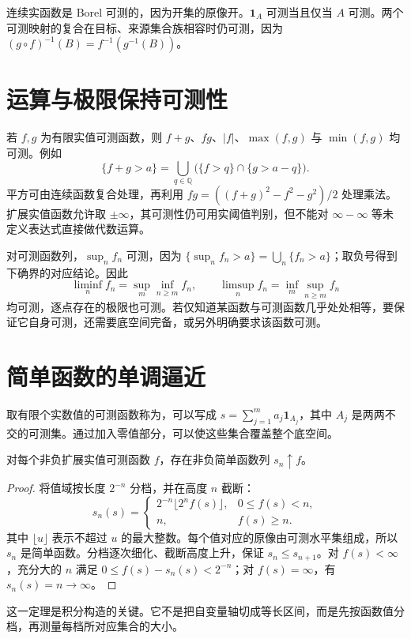 \documentclass[UTF8,12pt,a4paper,fontset=fandol]{ctexbook}
\begin{document}
连续实函数是 Borel 可测的，因为开集的原像开。$\mathbf1_A$ 可测当且仅当 $A$ 可测。两个可测映射的复合在目标、来源集合族相容时仍可测，因为 $(g\circ f)^{-1}(B)=f^{-1}(g^{-1}(B))$。

\section{运算与极限保持可测性}
若 $f,g$ 为有限实值可测函数，则 $f+g$、$fg$、$|f|$、$\max(f,g)$ 与 $\min(f,g)$ 均可测。例如
\[
 \{f+g>a\}=\bigcup_{q\in\mathbb Q}\bigl(\{f>q\}\cap\{g>a-q\}\bigr).
\]
平方可由连续函数复合处理，再利用 $fg=((f+g)^2-f^2-g^2)/2$ 处理乘法。扩展实值函数允许取 $\pm\infty$，其可测性仍可用实阈值判别，但不能对 $\infty-\infty$ 等未定义表达式直接做代数运算。

对可测函数列，$\sup_nf_n$ 可测，因为 $\{\sup_nf_n>a\}=\bigcup_n\{f_n>a\}$；取负号得到下确界的对应结论。因此
\[
 \liminf_nf_n=\sup_m\inf_{n\geq m}f_n,\qquad
 \limsup_nf_n=\inf_m\sup_{n\geq m}f_n
\]
均可测，逐点存在的极限也可测。若仅知道某函数与可测函数几乎处处相等，要保证它自身可测，还需要底空间完备，或另外明确要求该函数可测。

\section{简单函数的单调逼近}
\begin{definition}
取有限个实数值的可测函数称为，可以写成 $s=\sum_{j=1}^{m}a_j\mathbf1_{A_j}$，其中 $A_j$ 是两两不交的可测集。通过加入零值部分，可以使这些集合覆盖整个底空间。
\end{definition}

\begin{theorem}
对每个非负扩展实值可测函数 $f$，存在非负简单函数列 $s_n\uparrow f$。
\label{thm:mt-simple-approximation}
\end{theorem}
\begin{proof}
将值域按长度 $2^{-n}$ 分档，并在高度 $n$ 截断：
\[
 s_n(s)=
 \begin{cases}
  2^{-n}\lfloor 2^nf(s)\rfloor,&0\leq f(s)<n,\\
  n,&f(s)\geq n.
 \end{cases}
\]
其中 $\lfloor u\rfloor$ 表示不超过 $u$ 的最大整数。每个值对应的原像由可测水平集组成，所以 $s_n$ 是简单函数。分档逐次细化、截断高度上升，保证 $s_n\leq s_{n+1}$。对 $f(s)<\infty$，充分大的 $n$ 满足 $0\leq f(s)-s_n(s)<2^{-n}$；对 $f(s)=\infty$，有 $s_n(s)=n\to\infty$。
\end{proof}
这一定理是积分构造的关键。它不是把自变量轴切成等长区间，而是先按函数值分档，再测量每档所对应集合的大小。
\end{document}
